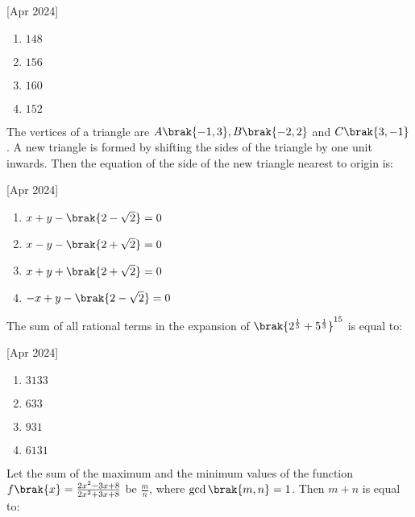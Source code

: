     \hfill[Apr 2024]

        \begin{multicols}{4}
            \begin{enumerate}
                \item $148$
                \item $156$
                \item $160$
                \item $152$
            \end{enumerate}
        \end{multicols}

    \item The vertices of a triangle are $A\brak{-1,3},B\brak{-2,2}$ and $C\brak{3,-1}$. A new triangle is formed by shifting the sides of the triangle by one unit inwards. Then the equation of the side of the new triangle nearest to origin is:
    
    \hfill[Apr 2024]

		\begin{multicols}{2}
			\begin{enumerate}
				\item $x+y-\brak{2-\sqrt{2}}=0$
				\item $x-y-\brak{2+\sqrt{2}}=0$
				\item $x+y+\brak{2+\sqrt{2}}=0$
				\item $-x+y-\brak{2-\sqrt{2}}=0$
			\end{enumerate}
		\end{multicols}

    \item The sum of all rational terms in the expansion of $\brak{2^\frac{1}{5}+5^\frac{1}{3}}^{15}$ is equal to:
    
    \hfill[Apr 2024]

		\begin{multicols}{4}
			\begin{enumerate}
				\item $3133$
				\item $633$
				\item $931$
				\item $6131$
			\end{enumerate}
		\end{multicols}
  
    \item Let the sum of the maximum and the minimum values of the function $f\brak{x}=\frac{2x^2-3x+8}{2x^2+3x+8}$ be $\frac{m}{n}$, where $\gcd\brak{m,n}=1$. Then $m+n$ is equal to:
    
